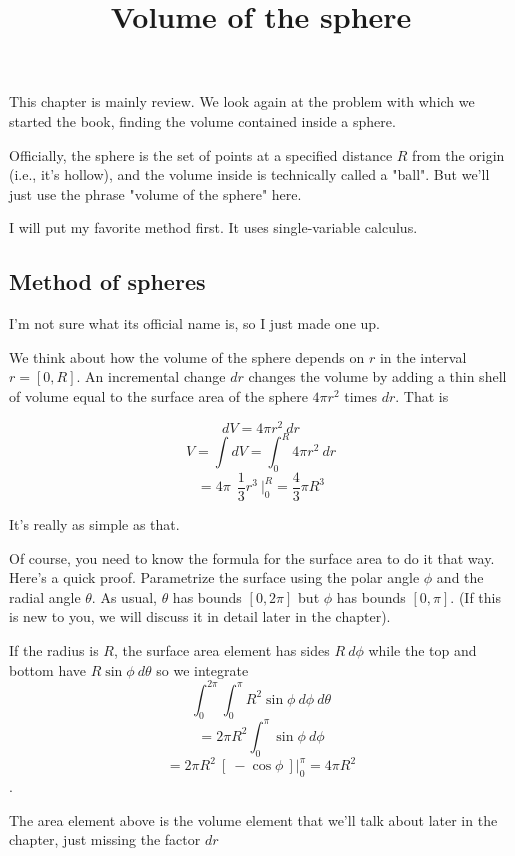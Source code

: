 \documentclass[11pt, oneside]{article}
\title{Volume of the sphere}
\date{}
\begin{document}
\maketitle
\Large



\label{sec:Volume_of_the_sphere}

This chapter is mainly review.  We look again at the problem with which we started the book, finding the volume contained inside a sphere.  

Officially, the sphere is the set of points at a specified distance $R$ from the origin (i.e., it's hollow), and the volume inside is technically called a "ball".  But we'll just use the phrase "volume of the sphere" here.

I will put my favorite method first.  It uses single-variable calculus.

\subsection*{Method of spheres}
I'm not sure what its official name is, so I just made one up.

We think about how the volume of the sphere depends on $r$ in the interval $r = [0,R]$.  An incremental change $dr$ changes the volume by adding a thin shell of volume equal to the surface area of the sphere $4 \pi r^2$ times $dr$.  That is

\[ dV = 4 \pi r^2 \ dr \]
\[ V = \int dV = \int_0^R 4 \pi r^2 \ dr \]
\[ = 4 \pi \ \ \frac{1}{3}r^3 \ \bigg |_0^R = \frac{4}{3}\pi R^3 \]

It's really as simple as that.

Of course, you need to know the formula for the surface area to do it that way.  Here's a quick proof.  Parametrize the surface using the polar  angle $\phi$ and the radial angle $\theta$.  As usual, $\theta$ has bounds $[0,2\pi]$ but $\phi$ has bounds $[0,\pi]$.  (If this is new to you, we will discuss it in detail later in the chapter).

If the radius is $R$, the surface area element has sides $R \ d \phi$ while the top and bottom have $R \sin \phi \ d \theta$ so we integrate
\[ \int_0^{2 \pi} \int_0^{\pi} R^2 \sin \phi \ d \phi \ d \theta \]
\[ = 2 \pi R^2 \int_0^{\pi} \sin \phi \ d \phi  \]
\[ = 2 \pi R^2 \ [ \ - \cos \phi \ ] \bigg |_0^{\pi} = 4 \pi R^2 \].

The area element above is the volume element that we'll talk about later in the chapter, just missing the factor $dr$
\end{document}
